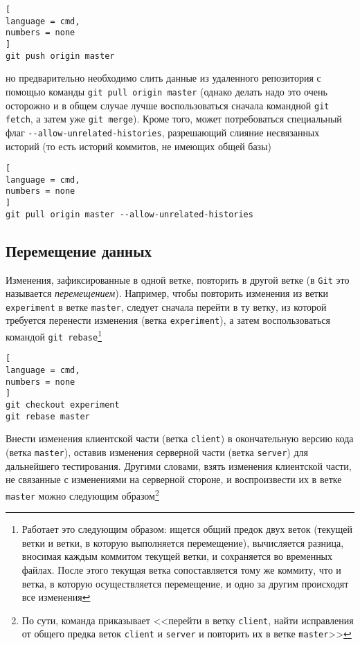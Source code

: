 \documentclass[%
	11pt,
	a4paper,
	utf8,
		]{article}
\begin{document}
\begin{lstlisting}[
language = cmd,
numbers = none
]
git push origin master
\end{lstlisting}

\noindent но предварительно необходимо слить данные из удаленного репозитория с помощью команды \texttt{git pull origin master} (однако делать надо это очень осторожно и в общем случае лучше воспользоваться сначала командной \texttt{git fetch}, а затем уже \texttt{git merge}). Кроме того, может потребоваться специальный флаг \verb|--allow-unrelated-histories|, разрешающий слияние несвязанных историй (то есть историй коммитов, не имеющих общей базы)

\begin{lstlisting}[
language = cmd,
numbers = none
]
git pull origin master --allow-unrelated-histories
\end{lstlisting}


\subsection{Перемещение данных}

Изменения, зафиксированные в одной ветке, повторить в другой ветке (в \texttt{Git} это называется \emph{перемещением}). Например, чтобы повторить изменения из ветки \texttt{experiment} в ветке \texttt{master}, следует сначала перейти в ту ветку, из которой требуется перенести изменения (ветка \texttt{experiment}), а затем воспользоваться командой \texttt{git rebase}\footnote{Работает это следующим образом: ищется общий предок двух веток (текущей ветки и ветки, в которую выполняется перемещение), вычисляется разница, вносимая каждым коммитом текущей ветки, и сохраняется во временных файлах. После этого текущая ветка сопоставляется тому же коммиту, что и ветка, в которую осуществляется перемещение, и одно за другим происходят все изменения}

\begin{lstlisting}[
language = cmd,
numbers = none
]
git checkout experiment
git rebase master
\end{lstlisting}


Внести изменения клиентской части (ветка \texttt{client}) в окончательную версию кода (ветка \texttt{master}), оставив изменения серверной части (ветка \texttt{server}) для дальнейшего тестирования. Другими словами, взять изменения клиентской части, не связанные с изменениями на серверной стороне, и воспроизвести их в ветке \texttt{master} можно следующим образом\footnote{По сути, команда приказывает <<перейти в ветку \texttt{client}, найти исправления от общего предка веток \texttt{client} и \texttt{server} и повторить их в ветке \texttt{master}>>}
\end{document}

